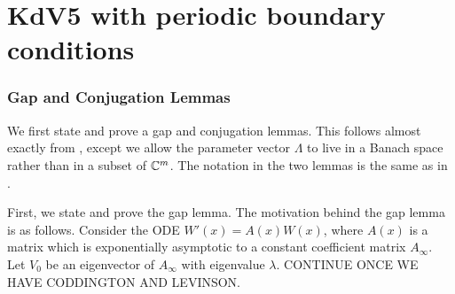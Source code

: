 \documentclass[thesis.tex]{subfiles}
\begin{document}
\chapter{KdV5 with periodic boundary conditions}

\subsection{Gap and Conjugation Lemmas}

We first state and prove a gap and conjugation lemmas. This follows almost exactly from \cite{Zumbrun2009}, except we allow the parameter vector $\Lambda$ to live in a Banach space rather than in a subset of ${\mathbb C}^m$. The notation in the two lemmas is the same as in \cite{Zumbrun2009}. 

First, we state and prove the gap lemma. The motivation behind the gap lemma is as follows. Consider the ODE $W'(x) = A(x)W(x)$, where $A(x)$ is a matrix which is exponentially asymptotic to a constant coefficient matrix $A_\infty$. Let $V_0$ be an eigenvector of $A_\infty$ with eigenvalue $\lambda$. CONTINUE ONCE WE HAVE CODDINGTON AND LEVINSON.
\end{document}
